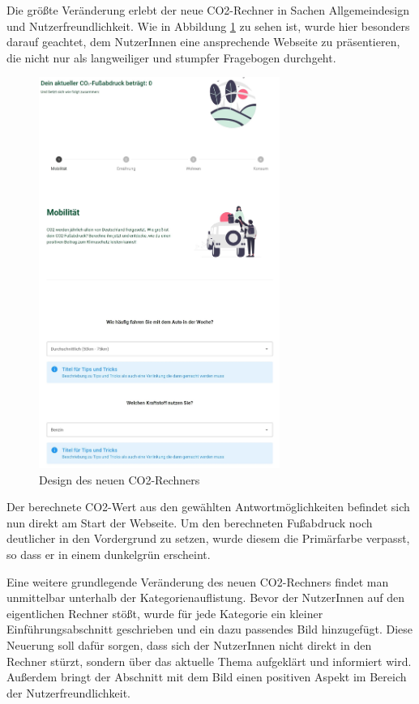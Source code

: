 Die größte Veränderung erlebt der neue CO2-Rechner in Sachen Allgemeindesign und Nutzerfreundlichkeit.
Wie in Abbildung \ref{fig:new-co2runter-calculator-design} zu sehen ist, wurde hier besonders darauf geachtet, dem NutzerInnen eine ansprechende Webseite zu präsentieren, die nicht nur als langweiliger und stumpfer Fragebogen durchgeht.

\begin{figure}[H]
    \centering
    \includegraphics[width=0.7\textwidth]{images/06/Calculator-New-Design.jpeg}
    \caption{Design des neuen CO2-Rechners}
    \label{fig:new-co2runter-calculator-design}
\end{figure}

Der berechnete CO2-Wert aus den gewählten Antwortmöglichkeiten befindet sich nun direkt am Start der Webseite.
Um den berechneten Fußabdruck noch deutlicher in den Vordergrund zu setzen, wurde diesem die Primärfarbe verpasst, so dass er in einem dunkelgrün erscheint.

Eine weitere grundlegende Veränderung des neuen CO2-Rechners findet man unmittelbar unterhalb der Kategorienauflistung.
Bevor der NutzerInnen auf den eigentlichen Rechner stößt, wurde für jede Kategorie ein kleiner Einführungsabschnitt geschrieben und ein dazu passendes Bild hinzugefügt.
Diese Neuerung soll dafür sorgen, dass sich der NutzerInnen nicht direkt in den Rechner stürzt, sondern über das aktuelle Thema aufgeklärt und informiert wird.
Außerdem bringt der Abschnitt mit dem Bild einen positiven Aspekt im Bereich der Nutzerfreundlichkeit.

